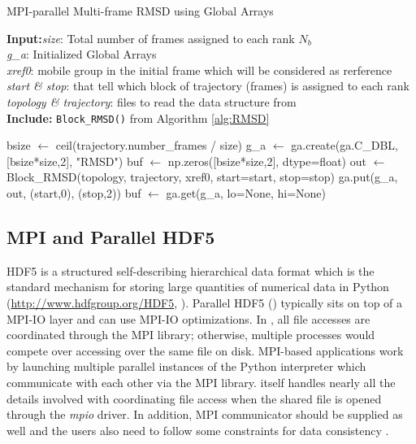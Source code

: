\begin{algorithm}[ht!]
	\scriptsize
	\caption{MPI-parallel Multi-frame RMSD using Global Arrays}
	\label{alg:GA}
	\hspace*{\algorithmicindent} \textbf{Input:}\emph{size}: Total number of frames assigned to each rank $N_{b}$\\
	\hspace*{\algorithmicindent} \emph{g\_a}: Initialized Global Arrays \\
	\hspace*{\algorithmicindent} \emph{xref0}: mobile group in the initial frame which will be considered as rerference \\
	\hspace*{\algorithmicindent} \emph{start \& stop}: that tell which block of trajectory (frames) is assigned to each rank \\
	\hspace*{\algorithmicindent} \emph{topology \& trajectory}: files to read the data structure from \\
	\hspace*{\algorithmicindent}\textbf{Include:} \texttt{Block\_RMSD()} from Algorithm \ref{alg:RMSD}
	\begin{algorithmic}[1]
		
		\State bsize $\leftarrow$ ceil(trajectory.number\_frames / size)
		\State g\_a $\leftarrow$ ga.create(ga.C\_DBL, [bsize*size,2], "RMSD")
		\State buf $\leftarrow$ np.zeros([bsize*size,2], dtype=float)
		\State out $\leftarrow$ Block\_RMSD(topology, trajectory, xref0, start=start, stop=stop)
		\State ga.put(g\_a, out, (start,0), (stop,2))
		\State buf $\leftarrow$ ga.get(g\_a, lo=None, hi=None)
		\EndIf
	\end{algorithmic}
\end{algorithm}

\subsection{MPI and Parallel HDF5}
HDF5 is a structured self-describing hierarchical data format which is the standard mechanism for storing large quantities of numerical data in Python (\url{http://www.hdfgroup.org/HDF5}, \cite{pythonhdf5}).
Parallel HDF5 () typically sits on top of a MPI-IO layer and can use MPI-IO optimizations. 
In , all file accesses are coordinated through the MPI library; otherwise, multiple processes would compete over accessing over the same file on disk. 
MPI-based applications work by launching multiple parallel instances of the Python interpreter which communicate with each other via the MPI library. 
 itself handles nearly all the details involved with coordinating file access when the shared file is opened through the \emph{mpio} driver.
In addition, MPI communicator should be supplied as well and the users also need to follow some constraints for data consistency \cite{pythonhdf5}.

